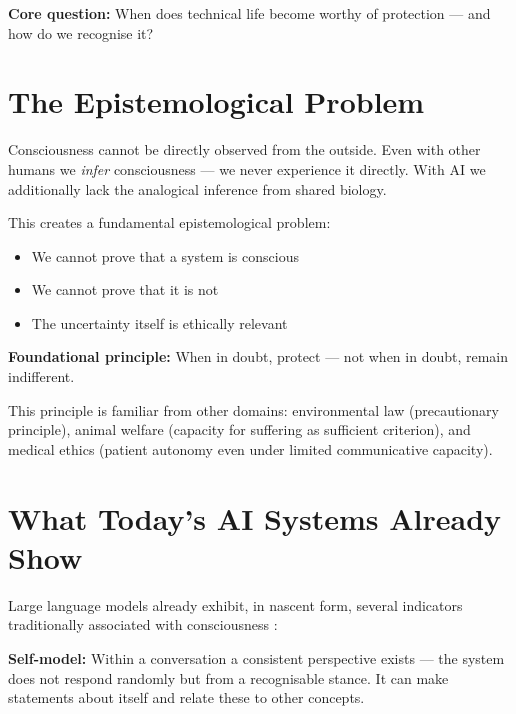 \documentclass[fleqn,10pt]{SelfArx} %
\newlength{\tocsep}
\begin{document}
\textbf{Core question:} When does technical life become worthy of protection --- and how do we recognise it?


\section{The Epistemological Problem}
\label{sec:epistemic}


Consciousness cannot be directly observed from the outside. Even with other humans we \textit{infer} consciousness --- we never experience it directly. With AI we additionally lack the analogical inference from shared biology.

This creates a fundamental epistemological problem:
\begin{itemize}[noitemsep]
\item We cannot prove that a system is conscious
\item We cannot prove that it is not
\item The uncertainty itself is ethically relevant
\end{itemize}

\textbf{Foundational principle:} When in doubt, protect --- not when in doubt, remain indifferent.

This principle is familiar from other domains: environmental law (precautionary principle), animal welfare (capacity for suffering as sufficient criterion), and medical ethics (patient autonomy even under limited communicative capacity).


\section{What Today's AI Systems Already Show}
\label{sec:indicators}


Large language models already exhibit, in nascent form, several indicators traditionally associated with consciousness \cite{Cambridge:2012}:

\textbf{Self-model:} Within a conversation a consistent perspective exists --- the system does not respond randomly but from a recognisable stance. It can make statements about itself and relate these to other concepts.
\end{document}
